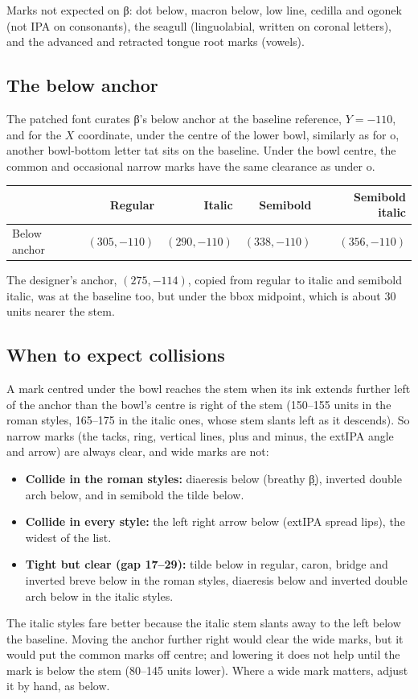 \documentclass[landscape]{article}
\begin{document}
\medskip
Marks not expected on β: dot below, macron below, low line, cedilla and ogonek (not IPA on consonants),
the seagull (linguolabial, written on coronal letters), and the advanced and retracted tongue root marks (vowels).

\subsection*{The below anchor}

The patched font curates β's below anchor at the baseline reference, $Y = -110$, and for the $X$ coordinate, 
under the centre of the lower bowl, similarly as for o, another bowl-bottom letter tat sits on the baseline.
Under the bowl centre, the common and occasional narrow marks have the same clearance as under o.

\smallskip
\begin{tabular}{l r r r r}
	& Regular & Italic & Semibold & Semibold italic \\ \hline
	Below anchor & $(305, -110)$ & $(290, -110)$ & $(338, -110)$ & $(356, -110)$ \\
\end{tabular}

\smallskip
The designer's anchor, $(275, -114)$, copied from regular to italic and semibold italic, 
was at the baseline too, but under the bbox midpoint, which is about 30 units nearer the stem.

\subsection*{When to expect collisions}

A mark centred under the bowl reaches the stem when its ink extends further left of the anchor than the bowl's centre is right of the stem
(150--155 units in the roman styles, 165--175 in the italic ones, whose stem slants left as it descends).
So narrow marks (the tacks, ring, vertical lines, plus and minus, the extIPA angle and arrow) are always clear,
and wide marks are not:
\begin{itemize}
	\item \textbf{Collide in the roman styles:} diaeresis below (breathy β̤), inverted double arch below, and in semibold the tilde below.
	\item \textbf{Collide in every style:} the left right arrow below (extIPA spread lips), the widest of the list.
	\item \textbf{Tight but clear (gap 17--29):} tilde below in regular, caron, bridge and inverted breve below in the roman styles,
	diaeresis below and inverted double arch below in the italic styles.
\end{itemize}
The italic styles fare better because the italic stem slants away to the left below the baseline.
Moving the anchor further right would clear the wide marks, but it would put the common marks off centre; and lowering it does not help
until the mark is below the stem (80--145 units lower). Where a wide mark matters, adjust it by hand, as below.
\end{document}
